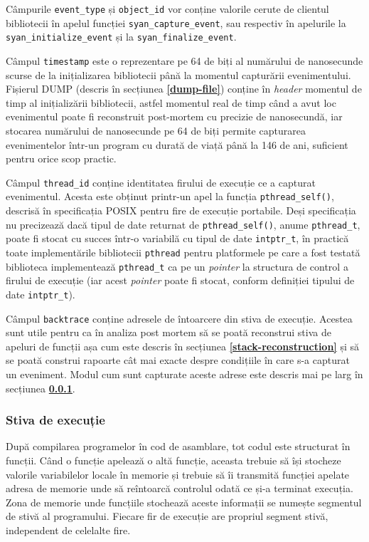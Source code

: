 Câmpurile \lstinline{event_type} și \lstinline{object_id} vor conține
valorile cerute de clientul bibliotecii în apelul funcției
\lstinline{syan_capture_event}, sau respectiv în apelurile la
\lstinline{syan_initialize_event} și la \lstinline{syan_finalize_event}.

Câmpul \lstinline{timestamp} este o reprezentare pe 64 de biți al
numărului de nanosecunde scurse de la inițializarea bibliotecii până la
momentul capturării evenimentului. Fișierul DUMP (descris în secțiunea
\textbf{\ref{dump-file}}) conține în \textit{header} momentul de timp al
inițializării bibliotecii, astfel momentul real de timp când a avut loc
evenimentul poate fi reconstruit post-mortem cu precizie de nanosecundă,
iar stocarea numărului de nanosecunde pe 64 de biți permite capturarea
evenimentelor într-un program cu durată de viață până la 146 de ani,
suficient pentru orice scop practic.

Câmpul \lstinline{thread_id} conține identitatea firului de execuție ce
a capturat evenimentul. Acesta este obținut printr-un apel la funcția
\lstinline{pthread_self()}, descrisă în specificația POSIX pentru fire
de execuție portabile\cite{pthread}. Deși specificația nu precizează
dacă tipul de date returnat de \lstinline{pthread_self()}, anume
\lstinline{pthread_t}, poate fi stocat cu succes într-o variabilă cu
tipul de date \lstinline{intptr_t}, în practică toate implementările
bibliotecii \lstinline{pthread} pentru platformele pe care a fost
testată biblioteca implementează \lstinline{pthread_t} ca pe un
\textit{pointer} la structura de control a firului de execuție (iar
acest \textit{pointer} poate fi stocat, conform definiției tipului de
date \lstinline{intptr_t}).

Câmpul \lstinline{backtrace} conține adresele de întoarcere din stiva de
execuție. Acestea sunt utile pentru ca în analiza post mortem să se
poată reconstrui stiva de apeluri de funcții așa cum este descris în
secțiunea \textbf{\ref{stack-reconstruction}} și să se poată construi
rapoarte cât mai exacte despre condițiile în care s-a capturat un
eveniment. Modul cum sunt capturate aceste adrese este descris mai pe
larg în secțiunea \textbf{\ref{stack-unwinding}}.

\subsubsection{Stiva de execuție}\label{stack-unwinding}

După compilarea programelor în cod de asamblare, tot codul este
structurat în funcții. Când o funcție apelează o altă funcție, aceasta
trebuie să își stocheze valorile variabilelor locale în memorie și
trebuie să îi transmită funcției apelate adresa de memorie unde să
reîntoarcă controlul odată ce și-a terminat execuția. Zona de memorie
unde funcțiile stochează aceste informații se numește segmentul de stivă
al programului. Fiecare fir de execuție are propriul segment stivă,
independent de celelalte fire.

